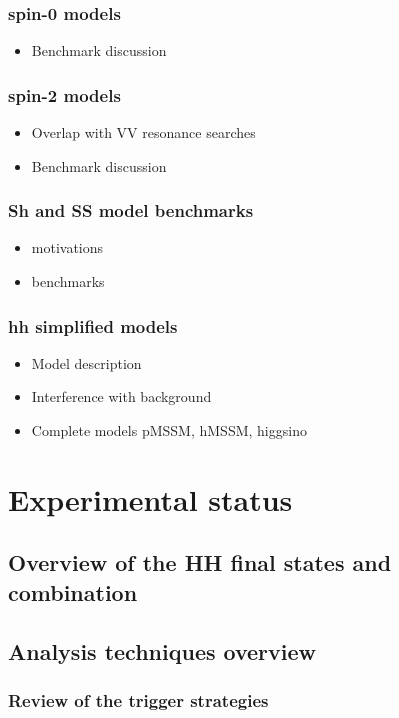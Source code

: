 \documentclass{book}
\begin{document}
\subsection{spin-0 models}
\begin{itemize}
    \item Benchmark discussion
\end{itemize}
\subsection{spin-2 models}
\begin{itemize}
    \item Overlap with VV resonance searches
    \item Benchmark discussion
\end{itemize}
\subsection{Sh and SS model benchmarks}
\begin{itemize}
    \item motivations
    \item benchmarks
\end{itemize}
\subsection{hh simplified models}
\begin{itemize}
\item Model description
\item Interference with background
\item Complete models pMSSM, hMSSM, higgsino
\end{itemize}

\chapter{Experimental status}
\section{Overview of the HH final states and combination}  
\section{Analysis techniques overview}
\subsection{Review of the trigger strategies}
\end{document}
